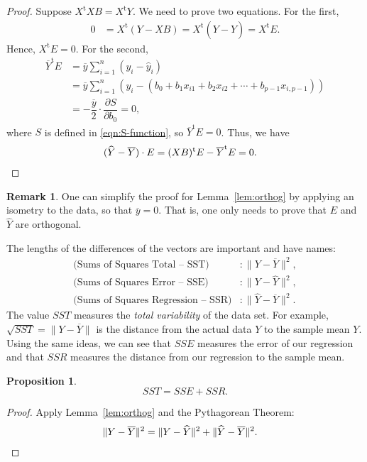 \documentclass[a4paper, 12pt]{article}
\numberwithin{equation}{section}
\numberwithin{figure}{section}
\newtheorem{prop}[thm]{Proposition}
\theoremstyle{definition}
\newtheorem{remark}[thm]{Remark}
\newcommand{\tr}{\mathrm{t}}
\begin{document}
\begin{proof}
	Suppose $X^{\tr}XB = X^{\tr}Y$. We need to prove two equations. For the
	first, 
	\begin{align*}
		0 &= X^{\tr}(Y - XB) = X^{\tr}(Y - \widehat{Y}) = X^{\tr}E.
	\end{align*}
	Hence, $X^{\tr}E=0$. For the second, 
	\begin{align*}
		\overline{Y}^{\tr}E &= \overline{y} \sum_{i=1}^n (y_i - \widehat{y}_i) \\
		&= \overline{y} \sum_{i=1}^n (y_i - (b_0+b_1x_{i1} + b_2x_{i2} + \cdots + b_{p-1}x_{i,p-1})) \\
		&= -\dfrac{\overline{y}}{2} \cdot \dfrac{\partial S}{\partial b_0} = 0,
	\end{align*}
	where $S$ is defined in \eqref{eqn:S-function}, so $\overline{Y}^{\tr}E=0$.
	Thus, we have 
	\begin{align*}
		(\widehat{Y} - \overline{Y}) \cdot E &= (XB)^{\tr} E - \overline{Y}^{\tr}E = 0. \qedhere
	\end{align*}
\end{proof}

\begin{remark}
	One can simplify the proof for Lemma~\ref{lem:orthog} by applying an isometry to
	the data, so that $\overline{y} = 0$. That is, one only needs to prove that
	$E$ and $\widehat{Y}$ are orthogonal.
\end{remark}

The lengths of the differences of the vectors are important and have names: 
\begin{align*} 
	\text{(Sums of Squares Total -- SST)} &: \|Y - \overline{Y} \|^2, \\
	\text{(Sums of Squares Error -- SSE)} &: \| Y - \widehat{Y}\|^2, \\
	\text{(Sums of Squares Regression -- SSR)} &: \| \widehat{Y} - \overline{Y}\|^2 .
\end{align*} 
The value $SST$ measures the \textit{total variability} of the data set. For
example, $\sqrt{SST} = \| Y - \overline{Y} \|$ is the distance from the actual
data $Y$ to the sample mean $Y$. Using the same ideas, we can see that $SSE$
measures the error of our regression and that $SSR$ measures the distance from
our regression to the sample mean. 

\begin{prop}\label{prop:SS-values}
	\[ 
		SST = SSE + SSR. 
	\] 
\end{prop}

\begin{proof}
	Apply Lemma~\ref{lem:orthog} and the Pythagorean Theorem:
	\begin{align*} 
		\| Y - \overline{Y} \|^2 &= \| Y - \widehat{Y}\|^2 + \| \widehat{Y} - \overline{Y} \|^2.  \qedhere
	\end{align*} 
\end{proof}
\end{document}
